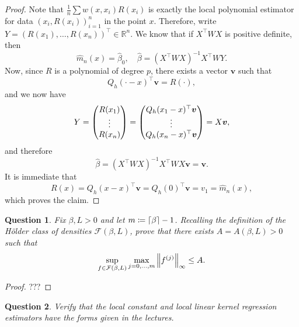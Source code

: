 \documentclass{article}
\theoremstyle{plain}
\newtheorem{question}{Question}
\theoremstyle{remark}
\renewcommand{\vec}{\boldsymbol}
\newcommand{\Bb}{\mathbb}
\newcommand{\Cal}{\mathcal}
\newcommand{\RR}{\Bb R}
\newcommand\FF{\Cal F}
\DeclarePairedDelimiter{\ceil}{\lceil}{\rceil}
\newcommand{\T}{^\top} %
\newcommand\ceq\coloneqq %
\begin{document}
\begin{proof}
	Note that $\frac1n \sum w(x, x_i) R(x_i)$ is exactly the local polynomial estimator for data $(x_i, R(x_i))_{i=1}^n$ in the point $x$. Therefore, write $Y = (R(x_1), \dotsc, R(x_n))\T \in \RR^n$. 
	We know that if $X\T W X$ is positive definite, then
	\[
	\hat m_n(x) = \hat\beta_0, \quad\hat\beta = (X\T W X)^{-1} X\T W Y. 
	\]
	Now, since $R$ is a polynomial of degree $p$, there exists a vector $\vec v$ such that
	\[
	Q_h(\cdot - x)\T \vec v = R(\cdot),
	\]
	and we now have
	\[
	Y = \mqty(R(x_1) \\ \vdots  \\ R(x_n)) = \mqty(Q_h(x_1 - x)\T \vec v \\ \vdots \\ Q_h(x_n - x)\T \vec v) = X\vec v, 
	\]
	and therefore
	\[
	\hat\beta = (X\T W X)^{-1} X\T W X \vec v = \vec v. 
	\]
	It is immediate that
	\[
	R(x) = Q_h(x - x)\T \vec v = Q_h(0)\T \vec v = v_1 = \hat m_n(x), 
	\]
	which proves the claim. 
\end{proof}

\begin{question}
	Fix $\beta, L > 0$ and let $m \ceq \ceil{\beta} - 1$. Recalling the definition of the H\"older class of densities $\FF(\beta, L)$, prove that there exists $A = A(\beta, L) > 0$ such that
	\[
	\sup_{f \in \FF(\beta, L)} \max_{j = 0, \dotsc, m} \norm{f^{(j)}}_\infty \leq A. 
	\]
\end{question}

\begin{proof}
	???
\end{proof}

\begin{question}
	Verify that the local constant and local linear kernel regression estimators have the forms given in the lectures. 
\end{question}
\end{document}
